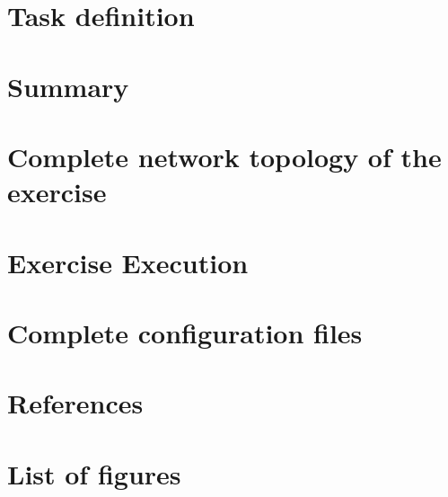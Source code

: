 \documentclass[a4paper]{article}
\begin{document}
\section{Task definition}



\section{Summary}


\newpage

\section{Complete network topology of the exercise}

\newpage

\section{Exercise Execution}


\newpage
\section{Complete configuration files}
\begin{multicols}{2}
\end{multicols}
\newpage
\section{References}

\newpage
\section{List of figures}

\listoffigures
\end{document}
